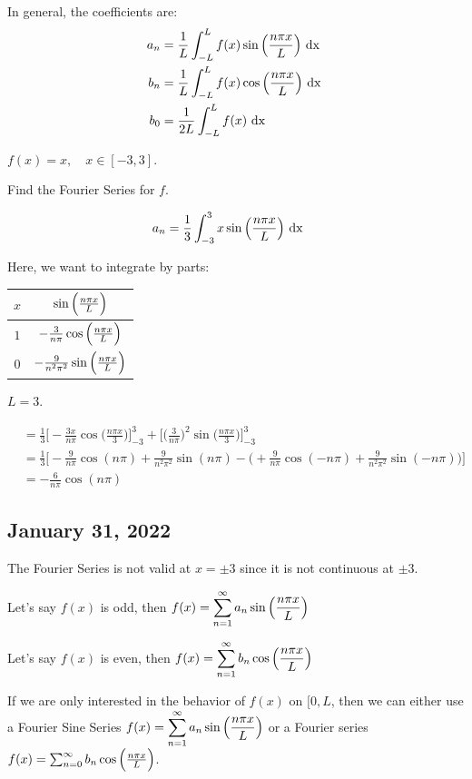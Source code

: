 \documentclass{article}
\begin{document}
  In general, the coefficients are:
  \begin{align}
    a_n & = \frac{1}{L} \int^L_{-L} f(x) \sin \Big( \frac{n \pi x}{L} \Big) \text{ dx }\\
    b_n & = \frac{1}{L} \int^L_{-L} f(x) \cos \Big( \frac{n \pi x}{L} \Big) \text{ dx }\\
    b_0 & = \frac{1}{2L} \int^L_{-L} f(x) \text{ dx }
  \end{align}

  \Ex $f(x) = x, \quad x \in [-3, 3]$.

  Find the Fourier Series for $f$.

  \begin{align}
    a_n & = \frac{1}{3} \int^3_{-3} x \sin \Big( \frac{n \pi x}{L} \Big) \text{ dx }
  \end{align}

  Here, we want to integrate by parts:
  \begin{center}
    \begin{tabular}{c|c}
      $x$ & $\sin \Big( \frac{n \pi x}{L} \Big)$\\
      \hline
      $1$ & $- \frac{3}{n \pi} \cos \Big( \frac{n \pi x}{L} \Big)$\\
      \hline
      $0$ & $- \frac{9}{n^2 \pi^2} \sin \Big( \frac{n \pi x}{L} \Big)$
    \end{tabular}
    \note $L = 3$.
  \end{center}

  \begin{align}
    & = \frac{1}{3} \Big[ -\frac{3 x}{n \pi} \cos\Big( \frac{n \pi x}{3} \Big) \Big]^3_{-3} + \Big[ \Big( \frac{3}{n \pi} \Big)^2 \sin\Big( \frac{n \pi x}{3} \Big)\Big]^3_{-3}\\
    & = \frac{1}{3} \Bigg[ -\frac{9}{n \pi} \cos(n \pi) + \frac{9}{n^2 \pi^2}
    \sin(n \pi) -
    \Big( +\frac{9}{n \pi} \cos(-n \pi) + \frac{9}{n^2 \pi^2} \sin(-n \pi) \Big)\Bigg]\\
    & = -\frac{6}{n \pi} \cos(n \pi)
  \end{align}

\newpage
\subsection*{January 31, 2022}
The Fourier Series is not valid at $x = \pm 3$ since it is not continuous at $\pm 3$.

Let's say $f(x)$ is odd, then $\displaystyle f(x) = \sum^\infty_{n = 1} a_n \sin \Big( \frac{n \pi x}{L} \Big)$

Let's say $f(x)$ is even, then $\displaystyle f(x) = \sum^\infty_{n = 1} b_n \cos \Big( \frac{n \pi x}{L} \Big)$

If we are only interested in the behavior of $f(x)$ on $[0, L$, then we can either use a Fourier Sine Series $\displaystyle f(x) = \sum^\infty_{n = 1} a_n \sin \Big( \frac{n \pi x}{L} \Big)$ or a Fourier series $f(x) = \sum^\infty_{n = 0} b_n \cos \Big( \frac{n \pi x}{L} \Big)$.
\end{document}
